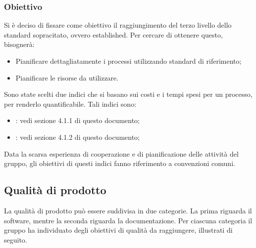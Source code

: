 \subsubsection{Obiettivo} 
Si è deciso di fissare come obiettivo il raggiungimento del terzo livello dello standard sopracitato, ovvero established. Per cercare di ottenere questo, bisognerà:
\begin{itemize}
\item Pianificare dettagliatamente i processi utilizzando standard di riferimento;
\item Pianificare le risorse da utilizzare.
\end{itemize}
Sono state scelti due indici che si basano sui costi e i tempi spesi per un processo, per renderlo quantificabile. Tali indici sono:
\begin{itemize}
\item {}: vedi sezione 4.1.1 di questo documento;
\item {}: vedi sezione 4.1.2 di questo documento;
\end{itemize} 
Data la scarsa esperienza di cooperazione e di pianificazione delle attività del gruppo, gli obiettivi di questi indici fanno riferimento a convenzioni comuni.

\subsection{Qualità di prodotto} %
\label{2.1.2}
La qualità di prodotto può essere suddivisa in due categorie. La prima riguarda il software, mentre la seconda riguarda la documentazione. Per ciascuna categoria il gruppo ha individuato degli obiettivi di qualità da raggiungere, illustrati di seguito.
